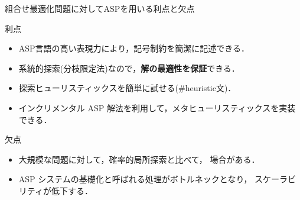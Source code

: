 \documentclass[11pt,dvipdfmx]{beamer}
\begin{document}
\begin{frame}{組合せ最適化問題に対してASPを用いる利点と欠点}
  \begin{alertblock}{利点}
    \begin{itemize}
    \item ASP言語の高い表現力により，記号制約を簡潔に記述できる．
    \item 系統的探索(分枝限定法)なので，\alert{\bf 解の最適性を保証}できる．
    \item 探索ヒューリスティックスを簡単に試せる(\textsf{\#heuristic}文)．
    \item インクリメンタル ASP 解法を利用して，メタヒューリスティックスを実装できる．
    \end{itemize}
  \end{alertblock}
  \bigskip
  \begin{block}{欠点}
    \begin{itemize}
    \item 大規模な問題に対して，確率的局所探索と比べて，
      場合がある．
    \item ASP システムの基礎化\footnotemark[1]
      と呼ばれる処理がボトルネックとなり，
      スケーラビリティが低下する．
    \end{itemize}
  \end{block}
\end{frame}
\end{document}
